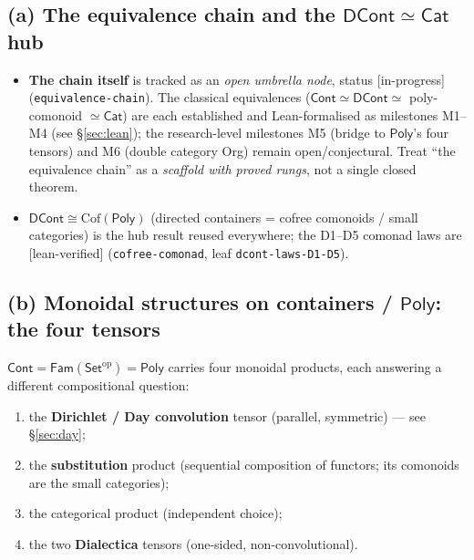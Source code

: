 \documentclass[11pt]{article}
\newcommand{\Cont}{\mathsf{Cont}}
\newcommand{\DCont}{\mathsf{DCont}}
\newcommand{\Poly}{\mathsf{Poly}}
\newcommand{\Cat}{\mathsf{Cat}}
\newcommand{\Fam}{\mathsf{Fam}}
\newcommand{\Set}{\mathsf{Set}}
\newcommand{\reg}[1]{\texttt{#1}}
\newcommand{\grade}[1]{\textsf{[#1]}}
\begin{document}
\subsection{(a) The equivalence chain and the \texorpdfstring{$\DCont\simeq\Cat$}{DCont=Cat} hub}

\begin{itemize}[leftmargin=1.2em]
\item \textbf{The chain itself} is tracked as an \emph{open umbrella node}, status
\grade{in-progress} (\reg{equivalence-chain}). The classical equivalences
($\Cont\simeq\DCont\simeq$ poly-comonoid $\simeq\Cat$) are each established and
Lean-formalised as milestones M1--M4 (see \S\ref{sec:lean}); the research-level
milestones M5 (bridge to $\Poly$'s four tensors) and M6 (double category \textsf{Org})
remain open/conjectural. Treat ``the equivalence chain'' as a \emph{scaffold with proved
rungs}, not a single closed theorem.
\item \textbf{$\DCont\cong\mathrm{Cof}(\Poly)$} (directed containers = cofree comonoids /
small categories) is the hub result reused everywhere; the D1--D5 comonad laws are
\grade{lean-verified} (\reg{cofree-comonad}, leaf \texttt{dcont-laws-D1-D5}).
\end{itemize}

\subsection{(b) Monoidal structures on containers / \texorpdfstring{$\Poly$}{Poly}: the four tensors}

$\Cont=\Fam(\Set^{\mathrm{op}})=\Poly$ carries four monoidal products, each answering a
different compositional question:
\begin{enumerate}[leftmargin=1.4em]
\item[$\otimes$] the \textbf{Dirichlet / Day convolution} tensor (parallel, symmetric) --- see \S\ref{sec:day};
\item[$\lhd$] the \textbf{substitution} product (sequential composition of functors; its comonoids are the small categories);
\item[$\times$] the categorical product (independent choice);
\item[$\ltimes/\rtimes$] the two \textbf{Dialectica} tensors (one-sided, non-convolutional).
\end{enumerate}
\end{document}

